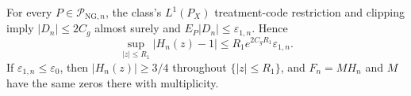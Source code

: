 For every \(P\in\mathcal P_{\mathrm{NG},n}\), the class's \(L^1(P_X)\) treatment-code restriction and clipping imply \(|D_n|\le2C_g\) almost surely and \(E_P|D_n|\le\varepsilon_{1,n}\). Hence
\[
 \sup_{|z|\le R_1}|H_n(z)-1|
 \le R_1e^{2C_gR_1}\varepsilon_{1,n}.
\]
If \(\varepsilon_{1,n}\le\varepsilon_0\), then \(|H_n(z)|\ge3/4\) throughout \(\{|z|\le R_1\}\), and \(F_n=M H_n\) and \(M\) have the same zeros there with multiplicity.